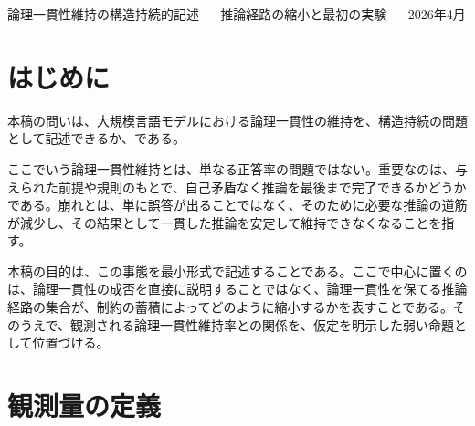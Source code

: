 \documentclass[12pt,a4paper]{article}
\begin{document}
\PaperTitleBlock
  {論理一貫性維持の構造持続的記述}
  {--- 推論経路の縮小と最初の実験 ---}
  {2026年4月}

\begin{abstract}
本稿は、大規模言語モデルにおける論理一貫性維持を、構造持続の最小形式~\cite{paper1}の最初の具体例として記述することを目的とする。観測量 $Y$ を、与えられた論理課題に対して、モデルが自己矛盾なく、与えられた規則や前提に反しない形で推論を完了できたかどうかとして独立に定義する。そのうえで、論理一貫性を保って推論を完了しうる候補経路の集合を置き、制約の蓄積をその集合の逐次縮小として表す。各段階の縮小率を対数で表すと、有効経路の残り方は指数型で記述される。ただし、本稿で直接に主張するのは、この指数型の上界そのものではなく、観測に使う指標 $z$ が増えるにつれて論理一貫性維持率 $Y$ が平均傾向として悪化する、という弱い命題である。この主張は、構造を保てたならそのための経路が必要であるという概念的前提、観測指標が経路の残り方を反映するという経験的前提、制約が縮小方向に働くという前提のもとで導かれる。さらに、範囲づけあり更新と範囲づけなし更新の比較を中心実験として提案し、この方向を検証する。
\end{abstract}

\section{はじめに}

本稿の問いは、大規模言語モデルにおける論理一貫性の維持を、構造持続の問題として記述できるか、である。

ここでいう論理一貫性維持とは、単なる正答率の問題ではない。重要なのは、与えられた前提や規則のもとで、自己矛盾なく推論を最後まで完了できるかどうかである。崩れとは、単に誤答が出ることではなく、そのために必要な推論の道筋が減少し、その結果として一貫した推論を安定して維持できなくなることを指す。

本稿の目的は、この事態を最小形式で記述することである。ここで中心に置くのは、論理一貫性の成否を直接に説明することではなく、論理一貫性を保てる推論経路の集合が、制約の蓄積によってどのように縮小するかを表すことである。そのうえで、観測される論理一貫性維持率との関係を、仮定を明示した弱い命題として位置づける。

\section{観測量の定義}
\end{document}
